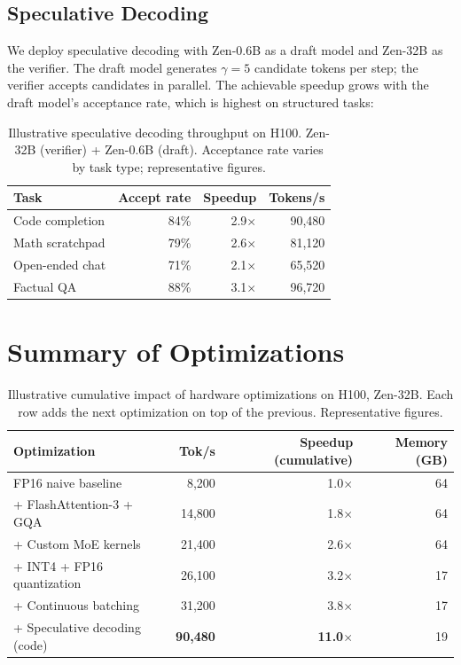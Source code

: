 \documentclass[11pt,a4paper]{article}
\begin{document}
\subsection{Speculative Decoding}

We deploy speculative decoding \cite{leviathan2023fast} with Zen-0.6B as a draft
model and Zen-32B as the verifier. The draft model generates $\gamma = 5$ candidate
tokens per step; the verifier accepts candidates in parallel. The achievable speedup
grows with the draft model's acceptance rate, which is highest on structured tasks:

\begin{table}[H]
\centering
\caption{Illustrative speculative decoding throughput on H100. Zen-32B (verifier) + Zen-0.6B
(draft). Acceptance rate varies by task type; representative figures.}
\begin{tabular}{lrrr}
\toprule
\textbf{Task} & \textbf{Accept rate} & \textbf{Speedup} & \textbf{Tokens/s} \\
\midrule
Code completion     & 84\% & 2.9$\times$ & 90,480 \\
Math scratchpad     & 79\% & 2.6$\times$ & 81,120 \\
Open-ended chat     & 71\% & 2.1$\times$ & 65,520 \\
Factual QA          & 88\% & 3.1$\times$ & 96,720 \\
\bottomrule
\end{tabular}
\label{tab:speculative}
\end{table}

\section{Summary of Optimizations}
\label{sec:summary}

\begin{table}[H]
\centering
\caption{Illustrative cumulative impact of hardware optimizations on H100, Zen-32B.
Each row adds the next optimization on top of the previous. Representative figures.}
\begin{tabular}{lrrr}
\toprule
\textbf{Optimization} & \textbf{Tok/s} & \textbf{Speedup (cumulative)} & \textbf{Memory (GB)} \\
\midrule
FP16 naive baseline           & 8,200  & 1.0$\times$ & 64 \\
+ FlashAttention-3 + GQA      & 14,800 & 1.8$\times$ & 64 \\
+ Custom MoE kernels          & 21,400 & 2.6$\times$ & 64 \\
+ INT4 + FP16 quantization    & 26,100 & 3.2$\times$ & 17 \\
+ Continuous batching         & 31,200 & 3.8$\times$ & 17 \\
+ Speculative decoding (code) & \textbf{90,480} & \textbf{11.0$\times$} & 19 \\
\bottomrule
\end{tabular}
\label{tab:cumulative}
\end{table}
\end{document}
